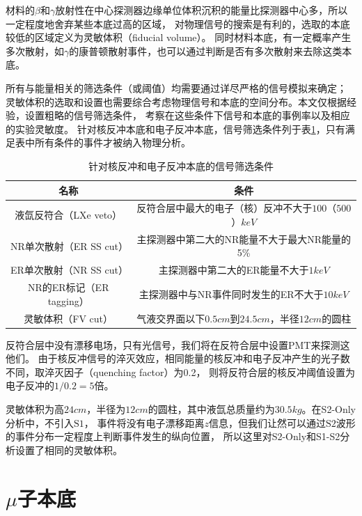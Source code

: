材料的$\beta$和$\gamma$放射性在中心探测器边缘单位体积沉积的能量比探测器中心多，所以一定程度地舍弃某些本底过高的区域，
对物理信号的搜索是有利的，选取的本底较低的区域定义为灵敏体积（fiducial volume）。
同时材料本底，有一定概率产生多次散射，如$\gamma$的康普顿散射事件，也可以通过判断是否有多次散射来去除这类本底。

所有与能量相关的筛选条件（或阈值）均需要通过详尽严格的信号模拟来确定；
灵敏体积的选取和设置也需要综合考虑物理信号和本底的空间分布。本文仅根据经验，设置粗略的信号筛选条件，
考察在这些条件下信号和本底的事例率以及相应的实验灵敏度。
针对核反冲本底和电子反冲本底，信号筛选条件列于表\ref{tab:cuts}，只有满足表中所有条件的事件才被纳入物理分析。

\begin{table}
  \centering
  \caption{针对核反冲和电子反冲本底的信号筛选条件}
  \begin{tabular}{cc}
    \toprule
    名称 & 条件 \\
    \midrule
    液氙反符合（LXe veto） & 反符合层中最大的电子（核）反冲不大于$100$（$500$）$\si{keV}$ \\
    NR单次散射（ER SS cut） & 主探测器中第二大的NR能量不大于最大NR能量的5\% \\
    ER单次散射（NR SS cut） & 主探测器中第二大的ER能量不大于$1\si{keV}$ \\
    NR的ER标记（ER tagging） & 主探测器中与NR事件同时发生的ER不大于$10\si{keV}$ \\
    灵敏体积（FV cut） & 气液交界面以下$0.5\si{cm}$到$24.5\si{cm}$，半径$12\si{cm}$的圆柱 \\
    \bottomrule
  \end{tabular}
  \label{tab:cuts}
\end{table}

反符合层中没有漂移电场，只有光信号，我们将在反符合层中设置PMT来探测这他们。
由于核反冲信号的淬灭效应，相同能量的核反冲和电子反冲产生的光子数不同，取淬灭因子（quenching factor）为0.2，
则将反符合层的核反冲阈值设置为电子反冲的$1/0.2=5$倍。

灵敏体积为高$24\si{cm}$，半径为$12\si{cm}$的圆柱，其中液氙总质量约为$30.5\si{kg}$。在S2-Only分析中，不引入$\mathrm{S1}$，
事件将没有电子漂移距离$z$信息，但我们让然可以通过$\mathrm{S2}$波形的事件分布一定程度上判断事件发生的纵向位置，
所以这里对S2-Only和S1-S2分析设置了相同的灵敏体积。

\section{$\mu$子本底}

